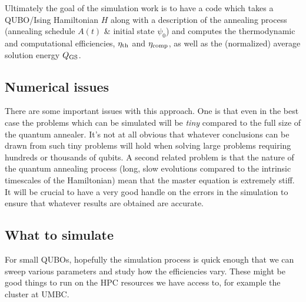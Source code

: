 \documentclass[aps,pra,amsmath,amssymb,amsfonts,lengthcheck,twocolumn,superscriptaddress]{revtex4-1}
\begin{document}
Ultimately the goal of the simulation work is to have a code which takes a QUBO/Ising Hamiltonian $H$ along with a description of the annealing process (annealing schedule $A(t)$ \& initial state $\psi_0$) and computes the thermodynamic and computational efficiencies, $\eta_{\rm th}$ and $\eta_{\rm comp}$, as well as the (normalized) average solution energy $Q_{\rm GS}$.

\subsection{Numerical issues}

There are some important issues with this approach.
One is that even in the best case the problems which can be simulated will be \emph{tiny} compared to the full size of the quantum annealer.
It's not at all obvious that whatever conclusions can be drawn from such tiny problems will hold when solving large problems requiring hundreds or thousands of qubits.
A second related problem is that the nature of the quantum annealing process (long, slow evolutions compared to the intrinsic timescales of the Hamiltonian) mean that the master equation is extremely stiff.
It will be crucial to have a very good handle on the errors in the simulation to ensure that whatever results are obtained are accurate.

\subsection{What to simulate}

For small QUBOs, hopefully the simulation process is quick enough that we can sweep various parameters and study how the efficiencies vary. 
These might be good things to run on the HPC resources we have access to, for example the cluster at UMBC.
\end{document}

